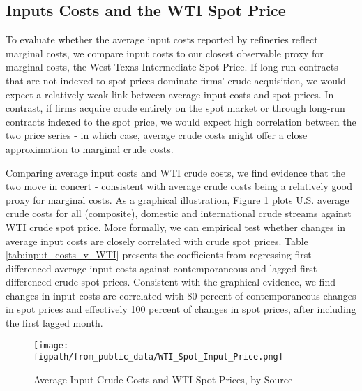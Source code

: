 \documentclass[12pt]{article}
\newcommand{\figpath}{../output/offline/figures}
\begin{document}
\setcounter{table}{0} \renewcommand{\thetable}{\Alph{section}.\arabic{table}}
\setcounter{figure}{0} \renewcommand{\thefigure}{\Alph{section}.\arabic{figure}}

\subsection{Inputs Costs and the WTI Spot Price \label{App:wti_average_crude_cost}}
To evaluate whether the average input costs reported by refineries reflect marginal costs, we compare input costs to our closest observable proxy for marginal costs, the West Texas Intermediate Spot Price.  If long-run contracts that are not-indexed to spot prices dominate firms' crude acquisition, we would expect a relatively weak link between average input costs and spot prices.  In contrast, if firms acquire crude entirely on the spot market or through long-run contracts indexed to the spot price, we would expect high correlation between the two price series - in which case, average crude costs might offer a close approximation to marginal crude costs.

Comparing average input costs and WTI crude costs, we find evidence that the two move in concert - consistent with average crude costs being a relatively good proxy for marginal costs.  As a graphical illustration, Figure \ref{fig:input_costs_v_WTI}  plots U.S. average crude costs for all (composite), domestic and international crude streams against WTI crude spot price.  More formally, we can empirical test whether changes in average input costs are closely correlated with crude spot prices.  Table \ref{tab:input_costs_v_WTI} presents the coefficients from regressing first-differenced average input costs against contemporaneous and lagged first-differenced crude spot prices.  Consistent with the graphical evidence, we find changes in input costs are correlated with 80 percent of contemporaneous changes in spot prices and effectively 100 percent of changes in spot prices, after including the first lagged month.
\begin{figure}[]
\begin{centering}
\caption{Average Input Crude Costs and WTI Spot Prices, by Source \label{fig:input_costs_v_WTI}}
\texttt{[image: \\figpath/from\_public\_data/WTI\_Spot\_Input\_Price.png]}
\par\end{centering}
\vspace{4pt}
\scriptsize
\end{figure}
\end{document}
